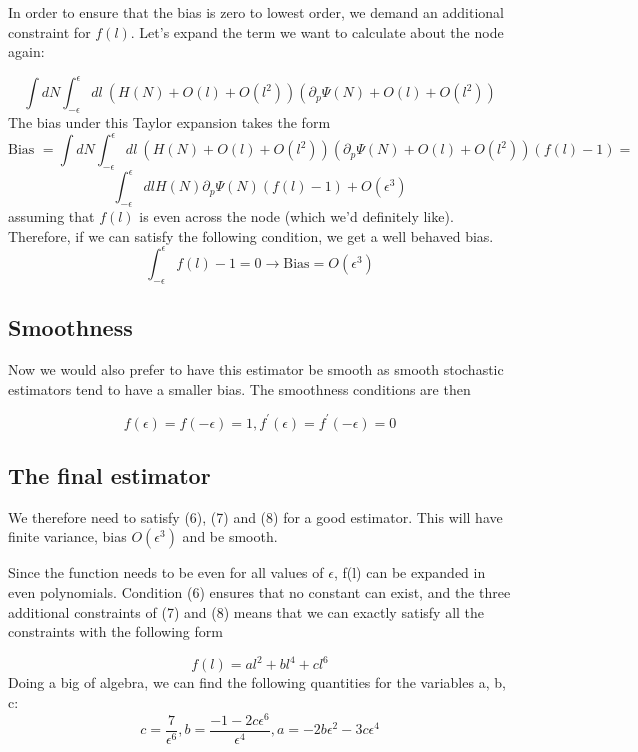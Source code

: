 \documentclass{article}
\begin{document}
In order to ensure that the bias is zero to lowest order, we demand an additional constraint for $f(l)$. 
Let's expand the term we want to calculate about the node again:

$$\int dN \int_{-\epsilon}^{\epsilon}dl \ (H(N) + O(l) + O(l^2)) (\partial_p\Psi(N) + O(l) + O(l^2)) $$
The bias under this Taylor expansion takes the form 
\begin{equation}
\text{Bias } = \int dN \int_{-\epsilon}^{\epsilon}dl \ (H(N) + O(l) + O(l^2)) (\partial_p\Psi(N) + O(l) + O(l^2))( f(l) - 1 ) = 
\end{equation}
$$
\int_{-\epsilon}^{\epsilon} dl H(N)\partial_p\Psi(N)(f(l) - 1) + O(\epsilon^3)
$$
assuming that $f(l)$ is even across the node (which we'd definitely like).
Therefore, if we can satisfy the following condition, we get a well behaved bias.
\begin{equation}
\int_{-\epsilon}^{\epsilon} f(l) - 1 = 0 \rightarrow \text{Bias} = O(\epsilon^3)
\end{equation}

\subsection{Smoothness} 
Now we would also prefer to have this estimator be smooth as smooth stochastic estimators tend to have a smaller bias. The smoothness conditions are then 

\begin{equation}
f(\epsilon) = f(-\epsilon) = 1, f^\prime(\epsilon) = f^\prime(-\epsilon) =0
\end{equation}

\subsection{The final estimator} 
We therefore need to satisfy (6), (7) and (8) for a good estimator. This will have finite variance, bias $O(\epsilon^3)$ and be smooth.

Since the function needs to be even for all values of $\epsilon$, f(l) can be expanded in even polynomials. Condition (6) ensures that no constant can exist, and the three additional constraints of (7) and (8) means that we can exactly satisfy all the constraints with the following form

\begin{equation}
f(l) = al^2 + bl^4 + cl^6 
\end{equation}
Doing a big of algebra, we can find the following quantities for the variables a, b, c:
\begin{equation}
c = \frac{7}{\epsilon^6}, 
b = \frac{-1 - 2c\epsilon^6}{\epsilon^4}, 
a = -2b\epsilon^2 -3c\epsilon^4
\end{equation}
\end{document}
